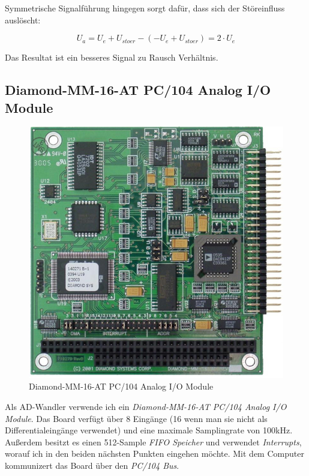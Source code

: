 \documentclass[12pt,a4paper]{scrartcl}
\begin{document}
Symmetrische Signalführung hingegen sorgt dafür, dass sich der Störeinfluss auslöscht:

\begin{equation}
U_a = U_e + U_{stoer} - ( -U_e + U_{stoer} ) = 2 \cdot U_e
\end{equation}

Das Resultat ist ein besseres Signal zu Rausch Verhältnis.


\subsection{Diamond-MM-16-AT PC/104 Analog I/O Module}

\begin{figure}[H]
\centering
\includegraphics[scale=.4]{hardwareimages/diamondmm16at.jpg}
\caption{Diamond-MM-16-AT PC/104 Analog I/O Module}
\label{diamond}
\end{figure}



Als AD-Wandler verwende ich ein \textit{Diamond-MM-16-AT PC/104 Analog I/O Module}. Das Board verfügt über 8 Eingänge (16 wenn man sie nicht als Differentialeingänge verwendet) und eine maximale Samplingrate von 100kHz. Außerdem besitzt es einen 512-Sample \textit{FIFO Speicher} und verwendet \textit{Interrupts}, worauf ich in den beiden nächsten Punkten eingehen möchte.
Mit dem Computer kommunizert das Board über den \textit{PC/104 Bus}.
\end{document}

